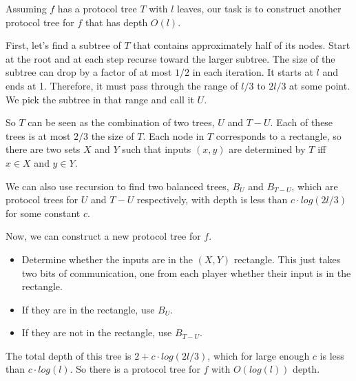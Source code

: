 \documentclass{article}
\newenvironment{problem}[2][Problem]{\begin{trivlist}
\item[\hskip \labelsep {\bfseries #1}\hskip \labelsep {\bfseries #2.}]}{\end{trivlist}}
\begin{document}
\begin{problem}{3}
  Assuming $f$ has a protocol tree $T$ with $l$ leaves, our task is to
  construct another protocol tree for $f$ that has depth $O(l)$.

  First, let's find a subtree of $T$ that contains approximately half
  of its nodes. Start at the root and at each step recurse toward the
  larger subtree. The size of the subtree can drop by a factor of at
  most $1/2$ in each iteration. It starts at $l$ and ends at
  1. Therefore, it must pass through the range of $l/3$ to $2l/3$ at
  some point. We pick the subtree in that range and call it $U$.

  So $T$ can be seen as the combination of two trees, $U$ and
  $T - U$. Each of these trees is at most $2/3$ the size of $T$. Each
  node in $T$ corresponds to a rectangle, so there are two sets $X$
  and $Y$ such that inputs $(x, y)$ are determined by $T$ iff
  $x \in X$ and $y \in Y$.

  We can also use recursion to find two balanced trees, $B_U$ and
  $B_{T-U}$, which are protocol trees for $U$ and $T-U$ respectively,
  with depth is less than $c \cdot log(2l/3)$ for some constant $c$.

  Now, we can construct a new protocol tree for $f$.

  \begin{itemize}
    \item Determine whether the
      inputs are in the $(X, Y)$ rectangle. This just takes two bits
      of communication, one from each player whether their input is in
      the rectangle.
    \item If they are in the rectangle, use $B_U$.
    \item If they are not in the rectangle, use $B_{T-U}$.
  \end{itemize}

  The total depth of this tree is $2 + c \cdot log(2l/3)$, which for large
  enough $c$ is less than $c \cdot log(l)$. So there is a protocol tree for
  $f$ with $O(log(l))$ depth.
\end{problem}

\begin{problem}{4}

\end{problem}
\end{document}
